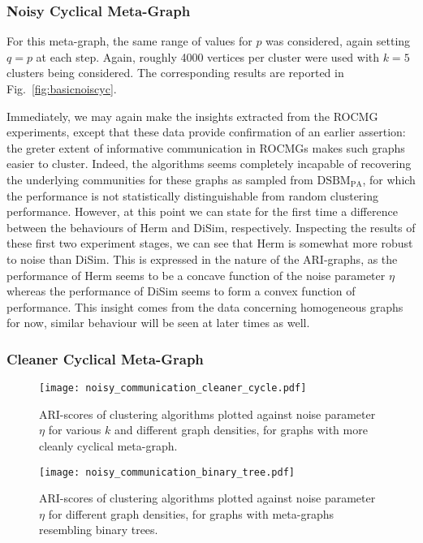 \subsubsection{Noisy Cyclical Meta-Graph}

For this meta-graph, the same range of values for $p$ was considered, again setting $q=p$ at each 
step. Again, roughly 4000 vertices per cluster were used with $k=5$ clusters being considered. The 
corresponding results are reported in Fig.\ \ref{fig:basicnoiscyc}.

Immediately, we may again make the insights extracted from the ROCMG experiments, except that 
these data provide confirmation of an earlier assertion: the greter extent of informative 
communication in ROCMGs makes such graphs easier to cluster. Indeed, the algorithms seems 
completely incapable 
of recovering the underlying communities for these graphs as sampled from $\mathrm{DSBM}_\mathrm{PA}$, 
for which the performance is not statistically distinguishable from random clustering performance. 
However, at this point we can state for the first time a difference between the behaviours of Herm 
and DiSim, respectively. Inspecting the results of these first two experiment stages, we can see 
that Herm is somewhat more robust to noise than DiSim. This is expressed in the nature of the 
ARI-graphs, as the performance of Herm seems to be a concave function of the noise parameter $\eta$
 whereas the performance of DiSim seems to form a convex function of performance. This insight 
comes from the data concerning homogeneous graphs for now, similar behaviour will be seen at later 
times as well.

\subsubsection{Cleaner Cyclical Meta-Graph}

\begin{figure}
\begin{center}
\texttt{[image: noisy\_communication\_cleaner\_cycle.pdf]}
\end{center}
\caption{ARI-scores of clustering algorithms plotted against noise parameter $\eta$ for various $k
$ and different graph densities, for graphs with more cleanly cyclical meta-graph.}
\label{fig:basiccleancyc}
\end{figure}

\begin{figure}
\begin{center}
\texttt{[image: noisy\_communication\_binary\_tree.pdf]}
\end{center}
\caption{ARI-scores of clustering algorithms plotted against noise parameter $\eta$ for 
 different graph densities, for graphs with meta-graphs resembling binary trees.}
\label{fig:basictree}
\end{figure}

